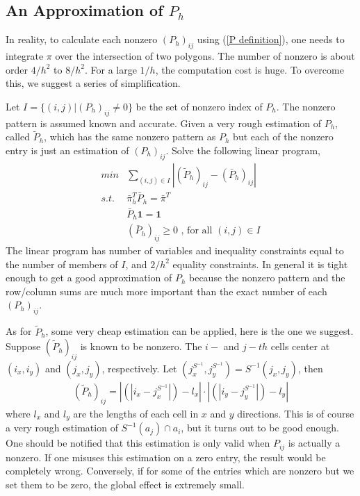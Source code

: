\documentclass{article}
\begin{document}
\subsection{An Approximation of $P_h$}

In reality, to calculate each nonzero $(P_h)_{ij}$ using (\ref{P
definition}), one needs to integrate $\pi$ over the intersection of
two polygons. The number of nonzero is about order $4/h^2$ to $8/h^2$.
For a large $1/h$, the computation cost is huge. To overcome this, we
suggest a series of simplification.

Let $I = \{(i,j)|(P_h)_{ij} \neq 0\}$ be the set of nonzero index of
$P_h$. The nonzero pattern is assumed known and accurate. Given a
very rough estimation of $P_h$, called $\tilde{P}_h$, which has the
same nonzero pattern as $P_h$ but each of the nonzero entry is just
an estimation of $(P_h)_{ij}$. Solve the following linear program,
 \begin{eqnarray}
 \label{LPforP}
       min  & \sum_{(i,j)\in I} |(\tilde{P}_h)_{ij} - (\bar{P}_h)_{ij}|\\
       s.t. & \bar{\pi}_h^T \bar{P}_h = \bar{\pi}^T   \nonumber\\
            & \bar{P}_h \mathbf{1}  = \mathbf{1}   \nonumber\\
            & (\bar{P}_h)_{ij} \ge 0    \mbox{  , for all }(i,j) \in I \nonumber
 \end{eqnarray}
The linear program has number of variables and inequality
constraints equal to the number of members of $I$, and $2/h^2$
equality constraints. In general it is tight enough to get a good
approximation of $P_h$ because the nonzero pattern and the
row/column sums are much more important than the exact number of
each $(P_h)_{ij}$.

As for $\tilde{P}_h$, some very cheap estimation can be applied,
here is the one we suggest. Suppose $(\tilde{P}_h)_{ij}$ is known to
be nonzero. The $i-$ and $j-th$ cells center at $(i_x,i_y)$ and
$(j_x,j_y)$, respectively. Let $(j_x^{S^{-1}},j_y^{S^{-1}}) =
S^{-1}(j_x,j_y)$, then
\begin{eqnarray}
 \label{arearaitioeq}
 (\tilde{P}_h)_{ij} = |(|i_x-j_x^{S^{-1}}|)-l_x| \cdot |(|i_y-j_y^{S^{-1}}|)-l_y|
\end{eqnarray}
where $l_x$ and $l_y$ are the lengths of each cell in $x$ and $y$
directions. This is of course a very rough estimation of
$S^{-1}(a_j) \cap a_i$, but it turns out to be good enough. One
should be notified that this estimation is only valid when
${P}_{ij}$ is actually a nonzero. If one misuses this estimation on
a zero entry, the result would be completely wrong. Conversely, if
for some of the entries which are nonzero but we set them to be
zero, the global effect is extremely small.
\end{document}
